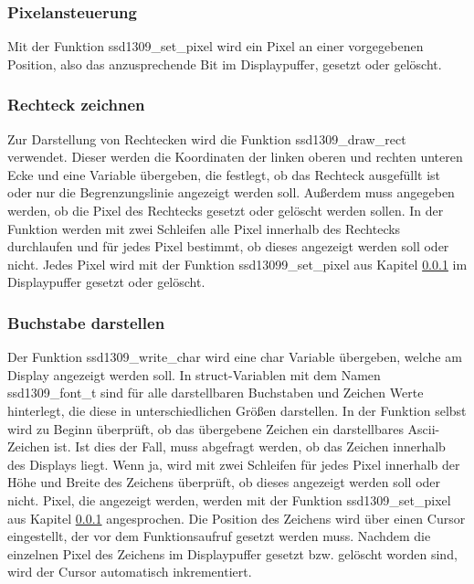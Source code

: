 \subsubsection{Pixelansteuerung}\label{sec:OLEDPixel}
Mit der Funktion \glqq ssd1309\_set\_pixel\grqq{} wird ein Pixel an einer vorgegebenen Position, also das anzusprechende Bit im Displaypuffer, gesetzt oder gelöscht.

\subsubsection{Rechteck zeichnen}\label{sec:OLEDRect}
Zur Darstellung von Rechtecken wird die Funktion \glqq ssd1309\_draw\_rect\grqq{} verwendet. Dieser werden die Koordinaten der linken oberen und rechten unteren Ecke und eine Variable übergeben, die festlegt, ob das Rechteck ausgefüllt ist oder nur die Begrenzungslinie angezeigt werden soll. Außerdem muss angegeben werden, ob die Pixel des Rechtecks gesetzt oder gelöscht werden sollen. In der Funktion werden mit zwei Schleifen alle Pixel innerhalb des Rechtecks durchlaufen und für jedes Pixel bestimmt, ob dieses angezeigt werden soll oder nicht. Jedes Pixel wird mit der Funktion \glqq ssd13099\_set\_pixel\grqq{} aus Kapitel \ref{sec:OLEDPixel} im Displaypuffer gesetzt oder gelöscht.

\subsubsection{Buchstabe darstellen}\label{sec:OLEDBuchstabe}
Der Funktion \glqq ssd1309\_write\_char\grqq{} wird eine char Variable übergeben, welche am Display angezeigt werden soll. In \glqq struct\grqq -Variablen mit dem Namen \glqq ssd1309\_font\_t\grqq{} sind für alle darstellbaren Buchstaben und Zeichen Werte hinterlegt, die diese in unterschiedlichen Größen darstellen. In der Funktion selbst wird zu Beginn überprüft, ob das übergebene Zeichen ein darstellbares Ascii-Zeichen ist. Ist dies der Fall, muss abgefragt werden, ob das Zeichen innerhalb des Displays liegt. Wenn ja, wird mit zwei Schleifen für jedes Pixel innerhalb der Höhe und Breite des Zeichens überprüft, ob dieses angezeigt werden soll oder nicht. Pixel, die angezeigt werden, werden mit der Funktion \glqq ssd1309\_set\_pixel\grqq{} aus Kapitel \ref{sec:OLEDPixel} angesprochen. Die Position des Zeichens wird über einen Cursor eingestellt, der vor dem Funktionsaufruf gesetzt werden muss. Nachdem die einzelnen Pixel des Zeichens im Displaypuffer gesetzt bzw. gelöscht worden sind, wird der Cursor automatisch inkrementiert.

